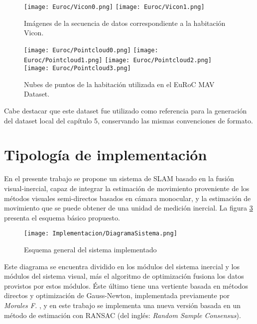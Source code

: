 \begin{figure}[H]
	\centering
	\texttt{[image: Euroc/Vicon0.png]}
	\texttt{[image: Euroc/Vicon1.png]}
	\caption[Imágenes de la secuencia de datos correspondiente a la habitación Vicon]{Imágenes de la secuencia de datos correspondiente a la habitación Vicon.}
	\label{fig:vicon}
\end{figure}


\begin{figure}[H]
	\centering
	\texttt{[image: Euroc/Pointcloud0.png]}
	\texttt{[image: Euroc/Pointcloud1.png]}
	\texttt{[image: Euroc/Pointcloud2.png]}
	\texttt{[image: Euroc/Pointcloud3.png]}
	\caption[Nubes de puntos de la habitación utilizada en el EuRoC MAV Dataset]{Nubes de puntos de la habitación utilizada en el EuRoC MAV Dataset.}
	\label{fig:pointcloudEuroc}
\end{figure}

Cabe destacar que este dataset fue utilizado como referencia para la generación del dataset local del capítulo 5, conservando las mismas convenciones de formato.

\section{Tipología de implementación}

En el presente trabajo se propone un sistema de SLAM basado en la fusión visual-inercial,  capaz de integrar  la estimación de movimiento  proveniente de los métodos visuales semi-directos basados en cámara monocular, y la estimación de movimiento que se puede obtener de una unidad de medición inercial. La figura \ref{fig:esquemaGeneral} presenta el esquema básico propuesto.

\begin{figure}[H]
	\centering
	\texttt{[image: Implementacion/DiagramaSistema.png]}
	\caption[Esquema general del sistema implementado]{Esquema general del sistema implementado}
	\label{fig:esquemaGeneral}
\end{figure}

Este diagrama se encuentra dividido en los módulos del sistema inercial y los módulos del sistema visual, más el algoritmo de optimización fusiona  los datos provistos por estos módulos. Éste último tiene una vertiente basada en métodos directos y optimización de Gauss-Newton, implementada previamente por \textit{Morales F.} \cite{fabio}, y en este trabajo se implementa una nueva versión basada en un método de estimación con RANSAC (del inglés: \textit{Random Sample Consensus}).


